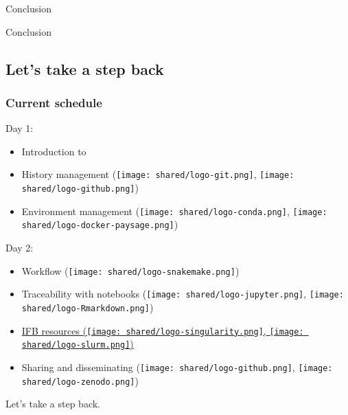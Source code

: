 \begin{frame}{Conclusion}

\huge{Conclusion}

\end{frame}

\subsection{Let's take a step back}

\begin{frame}{\FAIRB}
\frametitle{Current schedule}
Day 1:
\begin{itemize}
    \item Introduction to \FAIRB
    \item History management (\texttt{[image: shared/logo-git.png]}, \texttt{[image: shared/logo-github.png]})
    \item Environment management (\texttt{[image: shared/logo-conda.png]}, \texttt{[image: shared/logo-docker-paysage.png]})
\end{itemize}
Day 2:
\begin{itemize}    
    \item Workflow (\texttt{[image: shared/logo-snakemake.png]})
    \item Traceability with notebooks (\texttt{[image: shared/logo-jupyter.png]}, \texttt{[image: shared/logo-Rmarkdown.png]})
    \item \hyperlink{IFB}{IFB resources (\texttt{[image: shared/logo-singularity.png]}, \texttt{[image: shared/logo-slurm.png]})}
    \item Sharing and disseminating (\texttt{[image: shared/logo-github.png]}, \texttt{[image: shared/logo-zenodo.png]})
\end{itemize}
\end{frame}


\begin{frame}{\FAIRB}

\huge{Let's take a step back.}

\end{frame}

